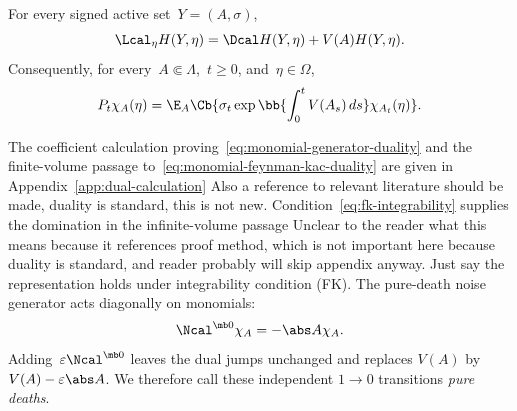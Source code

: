 \begin{theorem}
\label{thm:monomial-duality}
For every signed active set~$Y=(A,\sigma)$,
\begin{equation}
\label{eq:monomial-generator-duality}
\Lcal_\eta H(Y,\eta)
=
\Dcal H(Y,\eta)+V(A)H(Y,\eta).
\end{equation}
Consequently, for every~$A\Subset\Lambda$,~$t\geq0$, and~$\eta\in\Omega$,
\begin{equation}
\label{eq:monomial-feynman-kac-duality}
P_t\chi_A(\eta)
=
\E_A\Cb{
\sigma_t
\exp\bb{\int_0^t V(A_s)\,ds}
\chi_{A_t}(\eta)
}.
\end{equation}
\end{theorem}

The coefficient calculation proving~\eqref{eq:monomial-generator-duality} and
the finite-volume passage to~\eqref{eq:monomial-feynman-kac-duality} are given
in Appendix~\ref{app:dual-calculation} {\color{red} Also a reference to relevant literature should be made, duality is standard, this is not new}. Condition~\eqref{eq:fk-integrability}
supplies the domination in the infinite-volume passage {\color{red} Unclear to the reader what this means because it references proof method, which is not important here because duality is standard, and reader probably will skip appendix anyway. Just say the representation holds under integrability condition (FK)}. The pure-death noise
generator acts diagonally on monomials:
\begin{equation*}
\Ncal^{\mb 0}\chi_A=-\abs A\chi_A.
\end{equation*}
Adding~$\varepsilon\Ncal^{\mb 0}$ leaves the dual jumps unchanged and replaces
$V(A)$ by~$V(A)-\varepsilon\abs A$. We therefore call these independent
$1\to0$ transitions \emph{pure deaths}.
